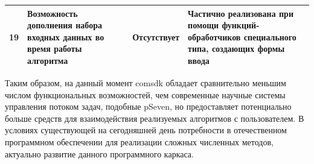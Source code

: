 \begin{landscape}
\begin{longtable}{|c|p{}|p{}|p{}|}
    \hline
    19         & Возможность дополнения набора входных данных во время работы алгоритма                     & Отсутствует                                                                                                                                                                                                                                                                                                                                                                                                                                                                                                                                                                                                                                                       & Частично реализована при помощи функций-обработчиков специального типа, создающих формы ввода                                                                                                                                                                                     \\
    \hline
  \end{longtable}
\end{landscape}

Таким образом, на данный момент comsdk обладает сравнительно меньшим числом функциональных возможностей, чем современные научные системы управления потоком задач, подобные pSeven, но предоставляет потенциально больше средств для взаимодействия реализуемых алгоритмов с пользователем. В условиях существующей на сегодняшней день потребности в отечественном программном обеспечении для реализации сложных численных методов, актуально развитие данного программного каркаса.